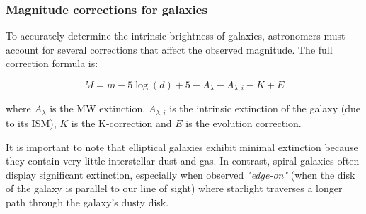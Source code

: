 \subsubsection{Magnitude corrections for galaxies}

To accurately determine the intrinsic brightness of galaxies, astronomers must account for several corrections that affect the observed magnitude. The full correction formula is:

$$
M = m - 5 \log (d) + 5 - A_{\lambda} - A_{\lambda, i} - K + E
$$

where $A_{\lambda}$ is the MW extinction, $A_{\lambda, i}$ is the intrinsic extinction of the galaxy (due to its ISM), $K$ is the K-correction and $E$ is the evolution correction.

It is important to note that elliptical galaxies exhibit minimal extinction because they contain very little interstellar dust and gas. In contrast, spiral galaxies often display significant extinction, especially when observed \textit{"edge-on"} (when the disk of the galaxy is parallel to our line of sight) where starlight traverses a longer path through the galaxy's dusty disk.

